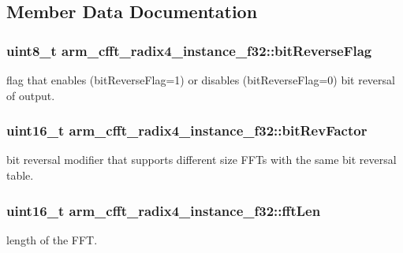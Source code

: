\subsection{Member Data Documentation}
\subsubsection[{\texorpdfstring{bit\+Reverse\+Flag}{bitReverseFlag}}]{\setlength{\rightskip}{0pt plus 5cm}uint8\+\_\+t arm\+\_\+cfft\+\_\+radix4\+\_\+instance\+\_\+f32\+::bit\+Reverse\+Flag}\hypertarget{structarm__cfft__radix4__instance__f32_ac10927a1620195a88649ce63dab66120}{}\label{structarm__cfft__radix4__instance__f32_ac10927a1620195a88649ce63dab66120}
flag that enables (bit\+Reverse\+Flag=1) or disables (bit\+Reverse\+Flag=0) bit reversal of output. 
\subsubsection[{\texorpdfstring{bit\+Rev\+Factor}{bitRevFactor}}]{\setlength{\rightskip}{0pt plus 5cm}uint16\+\_\+t arm\+\_\+cfft\+\_\+radix4\+\_\+instance\+\_\+f32\+::bit\+Rev\+Factor}\hypertarget{structarm__cfft__radix4__instance__f32_acc8cb18a8b901b8321ab9d86491e41a3}{}\label{structarm__cfft__radix4__instance__f32_acc8cb18a8b901b8321ab9d86491e41a3}
bit reversal modifier that supports different size F\+F\+Ts with the same bit reversal table. 
\subsubsection[{\texorpdfstring{fft\+Len}{fftLen}}]{\setlength{\rightskip}{0pt plus 5cm}uint16\+\_\+t arm\+\_\+cfft\+\_\+radix4\+\_\+instance\+\_\+f32\+::fft\+Len}\hypertarget{structarm__cfft__radix4__instance__f32_a7e6a6d290ce158ce9a15a45e364b021a}{}\label{structarm__cfft__radix4__instance__f32_a7e6a6d290ce158ce9a15a45e364b021a}
length of the F\+FT. 
